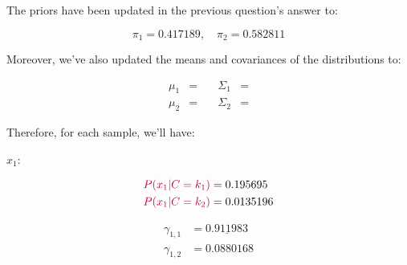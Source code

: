 \documentclass[12pt]{article}
\begin{document}
\begin{enumerate}[leftmargin=\labelsep]
\begin{enumerate}[leftmargin=\labelsep]
                The priors have been updated in the previous question's answer to:

                \begin{equation*}
                  \pi_1 = 0.417189, \quad
                  \pi_2 = 0.582811
                \end{equation*}

                Moreover, we've also updated the means and covariances of the distributions
                to:

                \begin{equation*}
                  \begin{aligned}
                    \mu_1 & =        \quad
                          & \Sigma_1                                             & =  \\
                    \mu_2 & =  \quad
                          & \Sigma_2                                             & = 
                  \end{aligned}
                \end{equation*}


                Therefore, for each sample, we'll have:

                \vspace*{0.5cm}

                \begin{paracol}{3}
                  \setlength{\columnseprule}{1pt}
                  \def\columnseprulecolor{\color{black}}
                  \centering

                  $x_1$:

                  \begin{normalsize}
                    \begin{equation*}
                      \begin{aligned}
                        \textcolor{purple}{P(x_1 | C = k_1)} & = 0.195695  \\
                        \textcolor{purple}{P(x_1 | C = k_2)} & = 0.0135196
                      \end{aligned}
                    \end{equation*}

                    \begin{equation*}
                      \begin{aligned}
                        \gamma_{1, 1} & = \underline{0.911983} \\
                        \gamma_{1, 2} & = 0.0880168
                      \end{aligned}
                    \end{equation*}
                  \end{normalsize}


\end{paracol}
\end{enumerate}
\end{enumerate}
\end{document}
